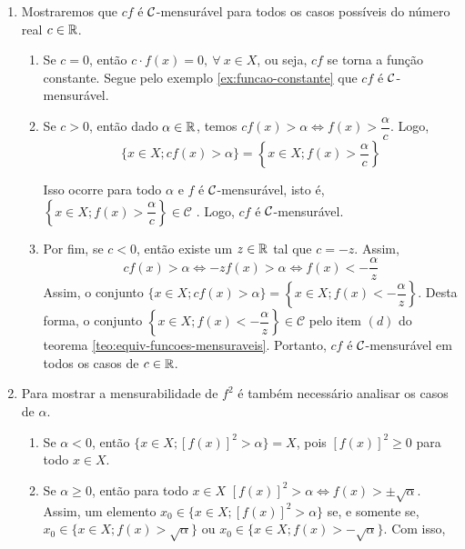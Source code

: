 \begin{prova}
    \begin{enumerate}[label*=(\alph*)]
        \item Mostraremos que $cf$ é $\operatorname{\mathcal{C}}$-mensurável para todos os casos possíveis do número real $c \in \mathbb{R}$.
            \begin{enumerate}[label=(\roman*)]
                \item Se $c = 0$, então $c\cdot f(x) = 0, \ \forall \ x \in X$, ou seja, $cf$ se torna a função constante. Segue pelo exemplo \ref{ex:funcao-constante} que $cf$ é $\operatorname{\mathcal{C}}$-mensurável.
                
                \item Se $c>0$, então  dado $\alpha \in \mathbb{R}$, temos $cf(x) > \alpha \Leftrightarrow f(x) >\dfrac{\alpha}{c}$. 
                Logo, 
                $$
                \{x \in X; cf(x) > \alpha\} 
                = 
                \left\{x \in X; f(x) > \dfrac{\alpha}{c}\right\}
                $$
                    
                Isso ocorre para todo $\alpha$ e $f$ é $\operatorname{\mathcal{C}}$-mensurável, isto é, $\left\{x \in X; f(x) > \dfrac{\alpha}{c}\right\} \in \mathcal{C}$  . Logo, $cf$ é $\operatorname{\mathcal{C}}$-mensurável.
                
                \item Por fim, se $c < 0$, então existe um $z \in \mathbb{R}$ tal que $c = -z$.
                Assim, 
                $$cf(x) >\alpha \Leftrightarrow -zf(x) >\alpha \Leftrightarrow f(x) < -\dfrac{\alpha}{z}$$
                Assim, o conjunto $\{x \in X; cf(x) > \alpha \} = \left\{x \in X; f(x) < -\dfrac{\alpha}{z}\right\}$.
                Desta forma, o conjunto  $\left\{x \in X; f(x) < -\dfrac{\alpha}{z}\right\}  \in \mathcal{C}$ pelo  item $(d)$ do teorema \ref{teo:equiv-funcoes-mensuraveis}. Portanto,  $cf$ é $\operatorname{\mathcal{C}}$-mensurável em todos os casos de $c \in \mathbb{R}$.
            \end{enumerate}
            
        \item Para mostrar a mensurabilidade de $f^2$ é também necessário analisar os casos de $\alpha$.
            \begin{enumerate}[label = (\roman*)]
                \item Se $\alpha < 0$, então $\{x \in X; [f(x)]^2 > \alpha\} = X$, pois $[f(x)]^2 \geq 0$ para todo $x \in X$.
                
                \item Se $\alpha \geq 0$, então para todo $x \in X$ $[f(x)]^2 > \alpha \Leftrightarrow f(x) > \pm \sqrt{\alpha}$.
                Assim, um elemento 
                $x_0 \in \{x \in X; [f(x)]^2 > \alpha\}$ se, e somente se, $x_0 \in \{x \in X; f(x)> \sqrt{\alpha}\}$ ou \linebreak $x_0 \in \{x \in X; f(x)> -\sqrt{\alpha}\}$.
                Com isso, 
                

\end{enumerate}
\end{enumerate}
\end{prova}
